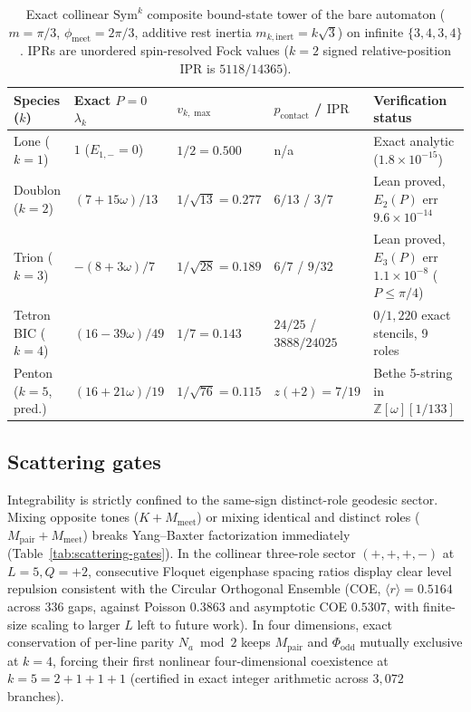 \begin{table}[tb]
\centering
\caption{Exact collinear $\mathrm{Sym}^k$ composite bound-state tower of the bare automaton ($m = \pi/3$,
$\phi_{\mathrm{meet}} = 2\pi/3$, additive rest inertia $m_{k,\mathrm{inert}} = k\sqrt{3}$) on infinite $\{3,4,3,4\}$.
IPRs are unordered spin-resolved Fock values ($k = 2$ signed relative-position IPR is $5118/14365$).}
\label{tab:composite-tower}
\footnotesize
\begin{tabularx}{\textwidth}{@{}>{\raggedright\arraybackslash}p{2.35cm}>{\raggedright\arraybackslash}p{2.35cm}>{\raggedright\arraybackslash}p{2.25cm}>{\raggedright\arraybackslash}p{2.25cm}>{\raggedright\arraybackslash}X@{}}
\toprule
Species ($k$) & Exact $P = 0$ $\lambda_k$ & $v_{k,\max}$ & $p_{\mathrm{contact}}$ / $\mathrm{IPR}$ & Verification status \\
\midrule
Lone ($k = 1$) & $1$ ($E_{1,-} = 0$) & $1/2 = 0.500$ & n/a & Exact analytic ($1.8 \times 10^{-15}$) \\
Doublon ($k = 2$) & $(7 + 15\omega)/13$ & $1/\sqrt{13} = 0.277$ & $6/13$ / $3/7$ & Lean proved, $E_2(P)$ err $9.6 \times 10^{-14}$ \\
Trion ($k = 3$) & $-(8 + 3\omega)/7$ & $1/\sqrt{28} = 0.189$ & $6/7$ / $9/32$ & Lean proved, $E_3(P)$ err $1.1 \times 10^{-8}$ ($P \le \pi/4$) \\
Tetron BIC ($k = 4$) & $(16 - 39\omega)/49$ & $1/7 = 0.143$ & $24/25$ / $3888/24025$ & $0/1{,}220$ exact stencils, 9 roles \\
Penton ($k = 5$, pred.) & $(16 + 21\omega)/19$ & $1/\sqrt{76} = 0.115$ & $z(+2) = 7/19$ & Bethe 5-string in $\mathbb{Z}[\omega][1/133]$ \\
\bottomrule
\end{tabularx}
\end{table}

\subsection{Scattering gates}

Integrability is strictly confined to the same-sign distinct-role geodesic sector. Mixing opposite tones
($K + M_{\mathrm{meet}}$) or mixing identical and distinct roles ($M_{\mathrm{pair}} + M_{\mathrm{meet}}$) breaks
Yang--Baxter factorization immediately (Table~\ref{tab:scattering-gates}). In the collinear three-role sector
$(+,+,+,-)$ at $L = 5, Q = +2$, consecutive Floquet eigenphase spacing ratios display clear level repulsion consistent
with the Circular Orthogonal Ensemble (COE, $\langle r \rangle = 0.5164$ across $336$ gaps, against Poisson $0.3863$ and
asymptotic COE $0.5307$, with finite-size scaling to larger $L$ left to future work). In four dimensions, exact
conservation of per-line parity $N_a \bmod 2$ keeps $M_{\mathrm{pair}}$ and $\Phi_{\mathrm{odd}}$ mutually exclusive at
$k = 4$, forcing their first nonlinear four-dimensional coexistence at $k = 5 = 2 + 1 + 1 + 1$ (certified in exact
integer arithmetic across $3{,}072$ branches).

